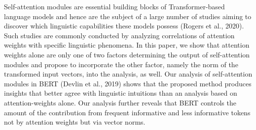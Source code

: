 Self-attention modules are essential building blocks of Transformer-based language models and hence are the subject of a large number of studies aiming to discover which linguistic capabilities these models possess (Rogers et al., 2020). Such studies are commonly conducted by analyzing correlations of attention weights with specific linguistic phenomena. In this paper, we show that attention weights alone are only one of two factors determining the output of self-attention modules and propose to incorporate the other factor, namely the norm of the transformed input vectors, into the analysis, as well. Our analysis of self-attention modules in BERT (Devlin et al., 2019) shows that the proposed method produces insights that better agree with linguistic intuitions than an analysis based on attention-weights alone. Our analysis further reveals that BERT controls the amount of the contribution from frequent informative and less informative tokens not by attention weights but via vector norms.
